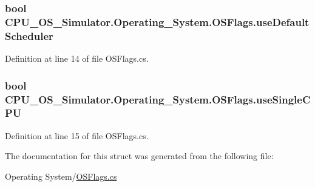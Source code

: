 \hypertarget{struct_c_p_u___o_s___simulator_1_1_operating___system_1_1_o_s_flags_a2ed45efd842faf68205cecfe73aaf11d}{}
\subsubsection[{use\+Default\+Scheduler}]{\setlength{\rightskip}{0pt plus 5cm}bool C\+P\+U\+\_\+\+O\+S\+\_\+\+Simulator.\+Operating\+\_\+\+System.\+O\+S\+Flags.\+use\+Default\+Scheduler}\label{struct_c_p_u___o_s___simulator_1_1_operating___system_1_1_o_s_flags_a2ed45efd842faf68205cecfe73aaf11d}


Definition at line 14 of file O\+S\+Flags.\+cs.

\hypertarget{struct_c_p_u___o_s___simulator_1_1_operating___system_1_1_o_s_flags_a49e0bc2c9ec783c9fb0678ace83352cf}{}
\subsubsection[{use\+Single\+C\+P\+U}]{\setlength{\rightskip}{0pt plus 5cm}bool C\+P\+U\+\_\+\+O\+S\+\_\+\+Simulator.\+Operating\+\_\+\+System.\+O\+S\+Flags.\+use\+Single\+C\+P\+U}\label{struct_c_p_u___o_s___simulator_1_1_operating___system_1_1_o_s_flags_a49e0bc2c9ec783c9fb0678ace83352cf}


Definition at line 15 of file O\+S\+Flags.\+cs.



The documentation for this struct was generated from the following file\+:\begin{DoxyCompactItemize}
\item 
Operating System/\hyperlink{_o_s_flags_8cs}{O\+S\+Flags.\+cs}\end{DoxyCompactItemize}
